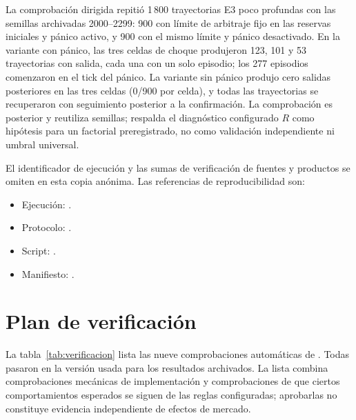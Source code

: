 La comprobación dirigida repitió 1\,800 trayectorias E3 poco profundas con las semillas archivadas 2000--2299: 900 con límite de arbitraje fijo en las reservas iniciales y pánico activo, y 900 con el mismo límite y pánico desactivado. En la variante con pánico, las tres celdas de choque produjeron 123, 101 y 53 trayectorias con salida, cada una con un solo episodio; los 277 episodios comenzaron en el tick del pánico. La variante sin pánico produjo cero salidas posteriores en las tres celdas (0/900 por celda), y todas las trayectorias se recuperaron con seguimiento posterior a la confirmación. La comprobación es posterior y reutiliza semillas; respalda el diagnóstico configurado $R$ como hipótesis para un factorial preregistrado, no como validación independiente ni umbral universal.

\ifdefined\blindreviewmode
El identificador de ejecución y las sumas de verificación de fuentes y productos se omiten en esta copia anónima.
\else
Las referencias de reproducibilidad son:
\begin{itemize}
  \item Ejecución: .
  \item Protocolo: .
  \item Script: .
  \item Manifiesto: .
\end{itemize}
\fi

\section{Plan de verificación}
\label{sec:verificacion}

La tabla~\ref{tab:verificacion} lista las nueve comprobaciones automáticas de . Todas pasaron en la versión usada para los resultados archivados. La lista combina comprobaciones mecánicas de implementación y comprobaciones de que ciertos comportamientos esperados se siguen de las reglas configuradas; aprobarlas no constituye evidencia independiente de efectos de mercado.

